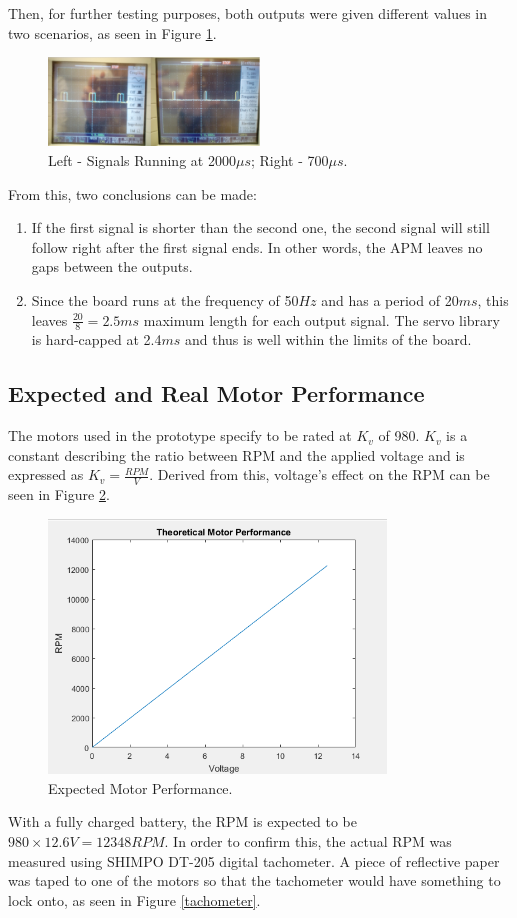 Then, for further testing purposes, both outputs were given different values in two scenarios, as seen in Figure \ref{oscillo3}.

\begin{figure}[H]
  \centering
    \includegraphics[width=0.5\textwidth]{images/oscillo3.png}
	\caption{Left - Signals Running at 2000$\mu s$; Right - 700$\mu s$.}
	\label{oscillo3}
\end{figure}

From this, two conclusions can be made:
\begin{enumerate}
\item If the first signal is shorter than the second one, the second signal will still follow right after the first signal ends. In other words, the APM leaves no gaps between the outputs.
\item Since the board runs at the frequency of 50$Hz$ and has a period of 20$ms$, this leaves $\frac{20}{8} = 2.5ms$ maximum length for each output signal. The servo library is hard-capped at 2.4$ms$ and thus is well within the limits of the board.
\end{enumerate}

\subsection{Expected and Real Motor Performance}
The motors used in the prototype specify to be rated at $K_v$ of 980. $K_v$ is a constant describing the ratio between RPM and the applied voltage and is expressed as $K_v = \frac{RPM}{V}$. Derived from this, voltage's effect on the RPM can be seen in Figure \ref{KvPlot}.
\begin{figure}[H]
  \centering
    \includegraphics[width=0.8\textwidth]{images/KvPlot.png}
	\caption{Expected Motor Performance.}
	\label{KvPlot}
\end{figure}
With a fully charged battery, the RPM is expected to be $980\times 12.6V = 12348 RPM$.
In order to confirm this, the actual RPM was measured using SHIMPO DT-205 digital tachometer. A piece of reflective paper was taped to one of the motors so that the tachometer would have something to lock onto, as seen in Figure \ref{tachometer}.

